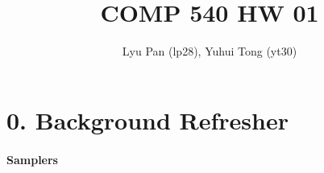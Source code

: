 \documentclass[english,11pt]{article}
\begin{document}
\title{COMP 540 HW 01 }

\author{Lyu Pan (lp28), Yuhui Tong (yt30)}
\maketitle




\part*{0. Background Refresher}

\subsection{Samplers} 
\end{document}
